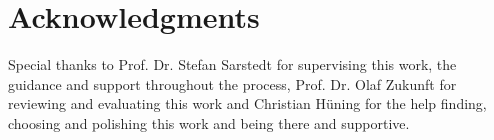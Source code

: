 %
\chapter{Acknowledgments}

Special thanks to Prof. Dr. Stefan Sarstedt for supervising this work, the guidance and support throughout the process, Prof. Dr. Olaf Zukunft for reviewing and evaluating this work and Christian Hüning for the help finding, choosing and polishing this work and being there and supportive.